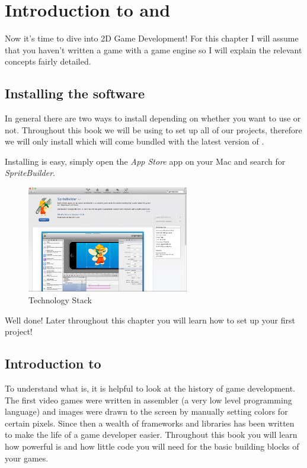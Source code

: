\chapter{Introduction to \SB{} and \cocos{} }
Now it's time to dive into 2D Game Development! For this chapter I will assume
that you haven't written a game with a game engine so I will explain the
relevant concepts fairly detailed.

\section{Installing the software}
In general there are two ways to install \cocos{} depending on whether you want
to use \SB{} or not. Throughout this book we will be using \SB{} to set up all
of our projects, therefore we will only install \SB{} which will come bundled
with the latest version of \cocos{}. 

Installing \SB{} is easy, simply open the \textit{App Store} app on your Mac and
search for \textit{SpriteBuilder}.

\begin{figure}[H] 
		\centering
		\includegraphics[width=200pt]{images/cocos2d/setup/mac_appstore_install.png}     
		\caption{\cocos{} Technology Stack}
\end{figure}

Well done! Later throughout this chapter you will learn how to set up your first
project!

\section{Introduction to \cocos{}}
To understand what \cocos{} is, it is helpful to look at the history of game
development. The first video games were written in assembler (a very low level
programming language) and images were drawn to the screen by manually setting
colors for certain pixels. Since then a wealth of frameworks and libraries has been written to make the life of a game
developer easier. Throughout this book you will learn how powerful \cocos{} is
and how little code you will need for the basic building blocks of your games.

